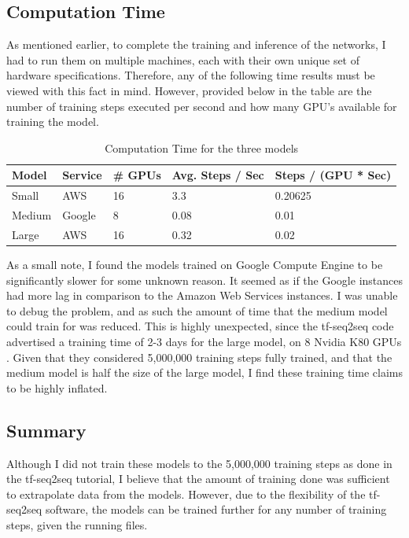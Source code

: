 \documentclass[pageno]{jpaper}
\begin{document}
\subsection{Computation Time}
As mentioned earlier, to complete the training and inference of the networks, I had to run them on multiple machines, each with their own unique set of hardware specifications.  Therefore, any of the following time results must be viewed with this fact in mind.  However, provided below in the table are the number of training steps executed per second and how many GPU's available for training the model.

\begin{table}[H]
	\centering
	\caption{Computation Time for the three models}
	\label{tb:comp_time}
	\begin{tabular}{|l|l|l|l|l|}
		\hline
		Model  & Service & \# GPUs & Avg. Steps / Sec & Steps / (GPU * Sec) \\ \hline
		Small  & AWS     & 16      & 3.3              & 0.20625             \\ \hline
		Medium & Google  & 8       & 0.08             & 0.01                \\ \hline
		Large  & AWS     & 16      & 0.32             & 0.02                \\ \hline
	\end{tabular}
\end{table}

\par
As a small note, I found the models trained on Google Compute Engine to be significantly slower for some unknown reason.  It seemed as if the Google instances had more lag in comparison to the Amazon Web Services instances.  I was unable to debug the problem, and as such the amount of time that the medium model could train for was reduced.  This is highly unexpected, since the tf-seq2seq code advertised a training time of 2-3 days for the large model, on 8 Nvidia K80 GPUs \cite{britz:2017}.  Given that they considered 5,000,000 training steps fully trained, and that the medium model is half the size of the large model, I find these training time claims to be highly inflated.

\subsection{Summary}
Although I did not train these models to the 5,000,000 training steps as done in the tf-seq2seq tutorial, I believe that the amount of training done was sufficient to extrapolate data from the models.  However, due to the flexibility of the tf-seq2seq software, the models can be trained further for any number of training steps, given the running files.
\end{document}
